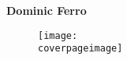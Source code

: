 \begin{titlepage}
    \begin{center}
        \vspace*{1cm}
            
        \Huge
        \textbf{\classnumber}
            
        \vspace{0.5cm}
        \LARGE
        \psnum
            
        \vspace{1.5cm}
            
        \textbf{Dominic Ferro}
            
        \vfill

	\begin{figure}[H]
		\centering
		\texttt{[image: \\coverpageimage]}
	\end{figure}

        \vspace{1.0cm}
            
        \Large
        \datedone
            
    \end{center}
\end{titlepage}
